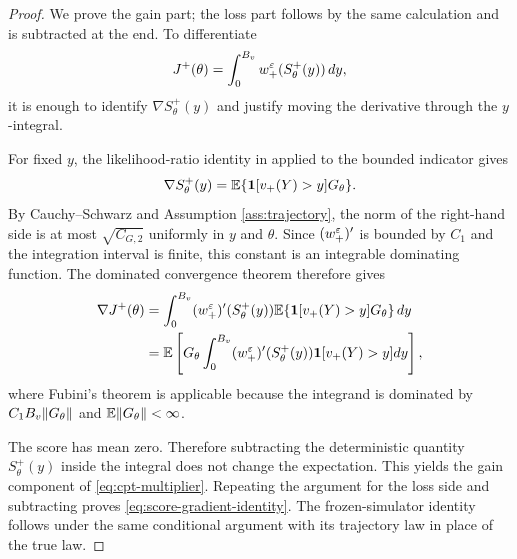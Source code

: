 \begin{proof}
We prove the gain part; the loss part follows by the same calculation and is subtracted at the end.  To differentiate
\[
 J^+(\theta)=\int_0^{B_v}w_+^\varepsilon(S_\theta^+(y))\,dy,
\]
it is enough to identify $\nabla S_\theta^+(y)$ and justify moving the derivative through the $y$-integral.

For fixed $y$, the likelihood-ratio identity in  applied to the bounded indicator gives
\begin{equation}\label{eq:survival-score-derivative}
 \nabla S_\theta^+(y)
 =\mathbb E\{\mathbf 1[v_+(Y)>y]G_\theta\}.
\end{equation}
By Cauchy--Schwarz and Assumption \ref{ass:trajectory}, the norm of the right-hand side is at most $\sqrt{C_{G,2}}$ uniformly in $y$ and $\theta$.  Since $(w_+^\varepsilon)'$ is bounded by $C_1$ and the integration interval is finite, this constant is an integrable dominating function.  The dominated convergence theorem therefore gives
\begin{align*}
 \nabla J^+(\theta)
 &=\int_0^{B_v}(w_+^\varepsilon)'(S_\theta^+(y))
 \mathbb E\{\mathbf 1[v_+(Y)>y]G_\theta\}\,dy\\
 &=\mathbb E\left[G_\theta
 \int_0^{B_v}(w_+^\varepsilon)'(S_\theta^+(y))\mathbf 1[v_+(Y)>y]dy\right],
\end{align*}
where Fubini's theorem is applicable because the integrand is dominated by $C_1B_v\lVert G_\theta\rVert$ and $\mathbb E\lVert G_\theta\rVert<\infty$.

The score has mean zero.  Therefore subtracting the deterministic quantity $S_\theta^+(y)$ inside the integral does not change the expectation.  This yields the gain component of \eqref{eq:cpt-multiplier}.  Repeating the argument for the loss side and subtracting proves \eqref{eq:score-gradient-identity}.  The frozen-simulator identity follows under the same conditional argument with its trajectory law in place of the true law.
\end{proof}
